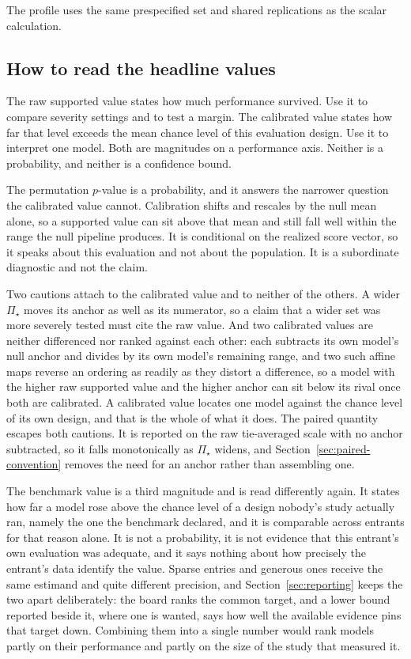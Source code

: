 \documentclass[11pt]{article}
\newcommand{\PSet}{\Pi_\star}
\theoremstyle{remark}
\begin{document}
The profile uses the same prespecified set and shared replications as the scalar calculation.

\subsection{How to read the headline values}

The raw supported value states how much performance survived. Use it to compare severity settings and to test a margin. The calibrated value states how far that level exceeds the mean chance level of this evaluation design. Use it to interpret one model. Both are magnitudes on a performance axis. Neither is a probability, and neither is a confidence bound.

The permutation $p$-value is a probability, and it answers the narrower question the calibrated value cannot. Calibration shifts and rescales by the null mean alone, so a supported value can sit above that mean and still fall well within the range the null pipeline produces. It is conditional on the realized score vector, so it speaks about this evaluation and not about the population. It is a subordinate diagnostic and not the claim.

Two cautions attach to the calibrated value and to neither of the others. A wider $\PSet$ moves its anchor as well as its numerator, so a claim that a wider set was more severely tested must cite the raw value. And two calibrated values are neither differenced nor ranked against each other: each subtracts its own model's null anchor and divides by its own model's remaining range, and two such affine maps reverse an ordering as readily as they distort a difference, so a model with the higher raw supported value and the higher anchor can sit below its rival once both are calibrated. A calibrated value locates one model against the chance level of its own design, and that is the whole of what it does. The paired quantity escapes both cautions. It is reported on the raw tie-averaged scale with no anchor subtracted, so it falls monotonically as $\PSet$ widens, and Section~\ref{sec:paired-convention} removes the need for an anchor rather than assembling one.

The benchmark value is a third magnitude and is read differently again. It states how far a model rose above the chance level of a design nobody's study actually ran, namely the one the benchmark declared, and it is comparable across entrants for that reason alone. It is not a probability, it is not evidence that this entrant's own evaluation was adequate, and it says nothing about how precisely the entrant's data identify the value. Sparse entries and generous ones receive the same estimand and quite different precision, and Section~\ref{sec:reporting} keeps the two apart deliberately: the board ranks the common target, and a lower bound reported beside it, where one is wanted, says how well the available evidence pins that target down. Combining them into a single number would rank models partly on their performance and partly on the size of the study that measured it.
\end{document}

